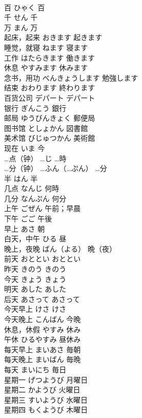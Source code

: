 \documentclass[8pt]{extreport}
\begin{document}
\begin{CJK}{UTF8}{min}
\\	百	ひゃく	百
\\	千	せん	千
\\	万	まん	万
\\	起床，起来	おきます	起きます
\\	睡觉，就寝	ねます	寝ます
\\	工作	はたらきます	働きます
\\	休息	やすみます	休みます
\\	念书，用功	べんきょうします	勉強します
\\	结束	おわります	終わります
\\	百货公司	デパート	デパート
\\	银行	ぎんこう	銀行
\\	邮局	ゆうびんきょく	郵便局
\\	图书馆	としょかん	図書館
\\	美术馆	びじゅつかん	美術館
\\	现在	いま	今
\\	…点（钟）	…じ	…時
\\	…分（钟）	…ふん（…ぷん）	…分
\\	半	はん	半
\\	几点	なんじ	何時
\\	几分	なんぷん	何分
\\	上午	ごぜん	午前；早晨
\\	下午	ごご	午後
\\	早上	あさ	朝
\\	白天，中午	ひる	昼
\\	晚上，夜晚	ばん（よる）	晩（夜）
\\	前天	おととい	おととい
\\	昨天	きのう	きのう
\\	今天	きょう	きょう
\\	明天	あした	あした
\\	后天	あさって	あさって
\\	今天早上	けさ	けさ
\\	今天晚上	こんばん	今晩
\\	休息，休假	やすみ	休み
\\	午休	ひるやすみ	昼休み
\\	每天早上	まいあさ	毎朝
\\	每天晚上	まいばん	毎晩
\\	每天	まいにち	毎日
\\	星期一	げつようび	月曜日
\\	星期二	かようび	火曜日
\\	星期三	すいようび	水曜日
\\	星期四	もくようび	木曜日

\end{CJK}
\end{document}
